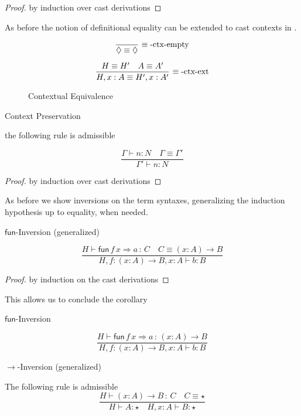 \begin{proof}
by induction over cast derivations
\end{proof}
As before the notion of definitional equality can be extended to cast contexts in .
 
\begin{figure}
\[
\frac{\ }{\lozenge\equiv\lozenge}\,\rulename{\ensuremath{\equiv}-ctx-empty}
\]
 
\[
\frac{H\equiv H'\quad A\equiv A'}{H,x:A\equiv H',x:A'}\,\operatorname{\equiv-ctx-ext}
\]
\caption{Contextual Equivalence}
\label{fig:cast-Context-Equiv}
\end{figure}
 
\begin{lem}
Context Preservation
 
the following rule is admissible
 
\[
\frac{\Gamma\vdash n:N\quad\Gamma\equiv\Gamma'}{\Gamma'\vdash n:N}
\]
\end{lem}
 
\begin{proof}
by induction over cast derivations
\end{proof}
As before we show inversions on the term syntaxes, generalizing the induction hypothesis up to equality, when needed.
\begin{lem}
$\mathsf{fun}$-Inversion (generalized)
 
\[
\frac{H\vdash\mathsf{fun}\,f\,x\Rightarrow a\,:\,C\quad C\equiv\left(x:A\right)\rightarrow B}{H,f:\left(x:A\right)\rightarrow B,x:A\vdash b:B}
\]
\end{lem}
 
\begin{proof}
by induction on the cast derivations
\end{proof}
 
This allows us to conclude the corollary
\begin{cor}
$\mathsf{fun}$-Inversion
 
\[
\frac{H\vdash\mathsf{fun}\,f\,x\Rightarrow a\,:\,\left(x:A\right)\rightarrow B}{H,f:\left(x:A\right)\rightarrow B,x:A\vdash b:B}
\]
\end{cor}
 
\begin{lem}
$\rightarrow$-Inversion (generalized)
 
The following rule is admissible
\[
\frac{H\vdash\left(x:A\right)\rightarrow B\,:\,C\quad C\equiv\star}{H\vdash A:\star\quad H,x:A\vdash B:\star}
\]
\end{lem}
 
